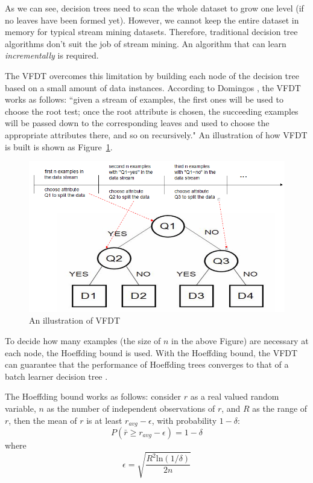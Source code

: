 \documentclass[conference]{IEEEtran}
\begin{document}
		As we can see, decision trees need to scan the whole dataset to grow one level (if no leaves have been formed yet). However, we cannot keep the entire dataset in memory for typical stream mining datasets. Therefore, traditional decision tree algorithms don't suit the job of stream mining. An algorithm that can learn \emph{incrementally} is required.
		
		The VFDT overcomes this limitation by building each node of the decision tree based on a small amount of data instances. According to Domingos \cite{VFDT}, the VFDT works as follows: ``given a stream of examples, the first ones will be used to choose the root test; once the root attribute is chosen, the succeeding examples will be passed down to the corresponding leaves and used to choose the appropriate attributes there, and so on recursively." An illustration of how VFDT is built is shown as Figure~\ref{fig:VFDT}.
		
		\begin{figure}[H]
			\centering
			\includegraphics[width=\linewidth]{figures/vfdt1} 
			\caption{An illustration of VFDT}
			\label{fig:VFDT}
		\end{figure}
		To decide how many examples (the size of $n$ in the above Figure) are necessary at each node, the Hoeffding bound is used. With the Hoeffding bound, the VFDT can guarantee that the performance of Hoeffding trees converges to that of a batch learner decision tree \cite{VFDT}.
		
		The Hoeffding bound works as follows: consider $r$ as a real valued random variable, $n$ as the number of independent observations of $r$, and $R$ as the range of $r$, then the mean of $r$ is at least $r_{avg}-\epsilon$, with probability $1-\delta$: 
		$$P(\bar{r} \geq r_{avg}-\epsilon) = 1-\delta$$ where $$ \epsilon=\sqrt{\frac{R^2 \text{ln}(1/\delta)}{2n}}$$
		
\end{document}
